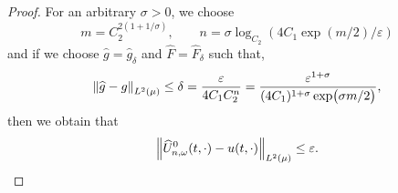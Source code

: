 \documentclass{article}
\numberwithin{equation}{section}
\renewcommand{\epsilon}{\varepsilon}
\newcommand{\1}{\mathbbm{1}}
\newcommand{\Fhat}{\widehat{F}}
\newcommand{\Uhat}{\widehat{U}}
\newcommand{\ghat}{\widehat{g}}
\begin{document}
\begin{proof}
For an arbitrary $\sigma>0$, we choose
\begin{equation}\label{eq:mn-choice}
    m = C_2^{2(1+1/\sigma)}, \qquad n = \sigma\log_{C_2} (4C_1\exp(m/2)/\epsilon)
\end{equation}
and if we choose $\ghat=\ghat_\delta$ and $\Fhat = \Fhat_\delta$ such that,
\begin{equation}\label{eq:delta-eta}
\begin{split}
    \norm{\ghat-g}_{L^2(\mu)} \leq \delta = \frac{\epsilon}{4C_1C_2^n} = \frac{\epsilon^{1+\sigma}}{(4C_1)^{1+\sigma}\exp(\sigma m/2)}, 
\end{split}
\end{equation}
then we obtain that
\begin{equation}
    \norm{\Uhat^0_{n,\omega}(t,\cdot)-u(t,\cdot)}_{L^2(\mu)} \leq \epsilon. 
\end{equation}


\end{proof}
\end{document}
